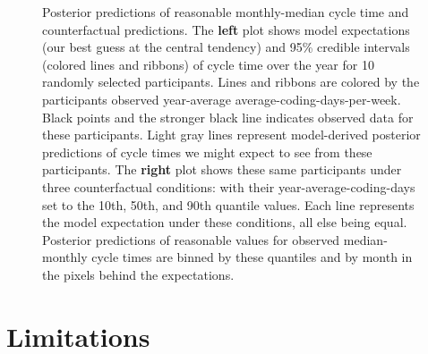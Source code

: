 \documentclass[manuscript,screen,review]{acmart}
\begin{document}
\begin{figure}


\caption[Posterior predictions of reasonable monthly-median cycle time
and counterfactual predictions]{\label{fig-ct-pp-traj}Posterior
predictions of reasonable monthly-median cycle time and counterfactual
predictions. The \textbf{left} plot shows model expectations (our best
guess at the central tendency) and 95\% credible intervals (colored
lines and ribbons) of cycle time over the year for 10 randomly selected
participants. Lines and ribbons are colored by the participants observed
year-average average-coding-days-per-week. Black points and the stronger
black line indicates observed data for these participants. Light gray
lines represent model-derived posterior predictions of cycle times we
might expect to see from these participants. The \textbf{right} plot
shows these same participants under three counterfactual conditions:
with their year-average-coding-days set to the 10th, 50th, and 90th
quantile values. Each line represents the model expectation under these
conditions, all else being equal. Posterior predictions of reasonable
values for observed median-monthly cycle times are binned by these
quantiles and by month in the pixels behind the expectations.}

\end{figure}%

\section{Limitations}\label{limitations}
\end{document}
